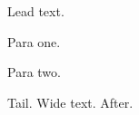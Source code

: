 \documentclass[twocolumn]{article}
\newenvironment{widetext}{\strip}{\endstrip}
\begin{document}
Lead text.
\begin{strip}
Para one.

Para two.
\end{strip}
Tail.
\begin{widetext}
Wide text.
\end{widetext}
After.
\end{document}
